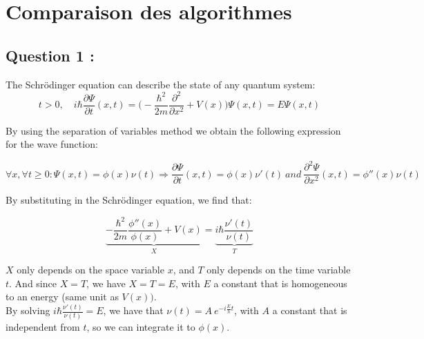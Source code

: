 \chapter{Comparaison des algorithmes}

\section{Question 1 : }

The Schrödinger equation can describe the state of any quantum system: 
\begin{equation}
    t>0, \quad i\hbar\frac{\partial \Psi}{\partial t}(x,t) = \bigg(-\frac{\hbar^{2}}{2m}\frac{\partial^{2}}{\partial x^{2}}+V(x)\bigg)\Psi(x,t)=E\Psi(x,t)
\end{equation}

By using the separation of variables method we obtain the following expression for the wave function:

$$
\forall x, \forall t\geq 0: \Psi(x,t)=\phi(x) \nu(t) \Rightarrow \frac{\partial \Psi}{\partial t}(x, t)= \phi(x) \nu'(t)~ and~ \frac{\partial^2\Psi}{\partial x^2}(x, t)=\phi''(x)\nu(t)
$$

By substituting in the Schrödinger equation, we find that: 

$$
\underbrace{-\frac{\hbar^2}{2m} \frac{\phi''(x)}{\phi(x)}+V(x)}_{X}=\underbrace{ i \hbar \frac{\nu'(t) }{\nu(t)}}_{T}
$$

$X$ only depends on the space variable $x$, and $T$ only depends on the time variable $t$. And since $X=T$, we have $X=T=E$, with $E$ a constant that is homogeneous to an energy (same unit as $V(x))$.\\
By solving $i \hbar \frac{\nu'(t) }{\nu(t)}=E$, we have that $\nu(t)=A~ e^{-i\frac{E}{h}t}$, with $A$ a constant that is independent from $t$, so we can integrate it to $\phi(x)$.